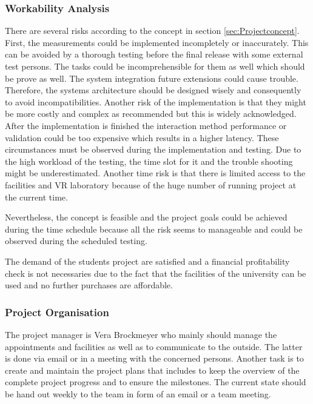 \subsubsection{Workability Analysis}\label{sec:PMworkabilityAnalysis}
There are several risks according to the concept in section \ref{sec:Projectconcept}. First, the measurements could be implemented incompletely or inaccurately. This can be avoided by a thorough testing before the final release with some external test persons. The tasks could be incomprehensible for them as well which should be prove as well.
The system integration future extensions could cause trouble. Therefore, the systems architecture should be designed wisely and consequently to avoid incompatibilities. Another risk of the implementation is that they might be more costly and complex as recommended but this is widely acknowledged. After the implementation is finished the interaction method performance or validation could be too expensive which results in a higher latency. These circumstances must be observed during the implementation and testing. Due to the high workload of the testing, the time slot for it and the trouble shooting might be underestimated. Another time risk is that there is limited access to the facilities and VR laboratory because of the huge number of running project at the current time.

Nevertheless, the concept is feasible and the project goals could be achieved during the time schedule because all the risk seems to manageable and could be observed during the scheduled testing.

The demand of the students project are satisfied and a financial profitability check is not necessaries due to the fact that the facilities of the university can be used and no further purchases are affordable.


\subsubsection{Project Organisation}\label{sec:PMProjectOrganisation}

The project manager is Vera Brockmeyer who mainly should manage the appointments and facilities as well as to communicate to the outside. The latter is done via email or in a meeting with the concerned persons. Another task is to create and maintain the project plans that includes to keep the overview of the complete project progress and to ensure the milestones.
The current state should be hand out weekly to the team in form of an email or a team meeting.


